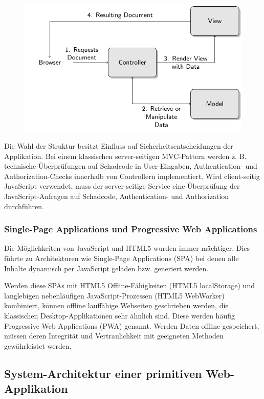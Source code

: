 \begin{figure}[h!]
	\includegraphics[width=\textwidth]{graphs/mvc.pdf}
	\centering
\end{figure}

Die Wahl der Struktur besitzt Einfluss auf Sicherheitsentscheidungen der Applikation. Bei einem klassischen server-seitigen MVC-Pattern werden z. B. technische Überprüfungen auf Schadcode in User-Eingaben, Authentication- und Authorization-Checks innerhalb von Controllern implementiert. Wird client-seitig JavaScript verwendet, muss der server-seitige Service eine Überprüfung der JavaScript-Anfragen auf Schadcode, Authentication- und Authorization durchführen.

\subsubsection{Single-Page Applications und Progressive Web Applications}

Die Möglichkeiten von JavaScript und HTML5 wurden immer mächtiger. Dies führte zu Architekturen wie Single-Page Applications (SPA) bei denen alle Inhalte dynamisch per JavaScript geladen bzw. generiert werden.

Werden diese SPAs mit HTML5 Offline-Fähigkeiten (HTML5 localStorage) und langlebigen nebenläufigen JavaScript-Prozessen (HTML5 WebWorker) kombiniert, können offline lauffähige Webseiten geschrieben werden, die klassischen Desktop-Applikationen  sehr ähnlich sind. Diese werden häufig Progressive Web Applications (PWA) genannt. Werden Daten offline gespeichert, müssen deren Integrität und Vertraulichkeit mit geeigneten Methoden gewährleistet werden.

\subsection{System-Architektur einer primitiven Web-Applikation}


